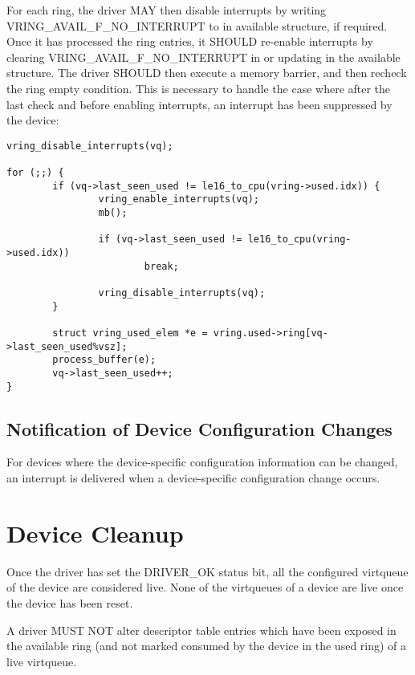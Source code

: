For each ring, the driver MAY then disable interrupts by writing
VRING_AVAIL_F_NO_INTERRUPT to  in available structure, if required.
Once it has processed the ring entries, it SHOULD re-enable
interrupts by clearing VRING_AVAIL_F_NO_INTERRUPT in  or updating
 in the available structure.  The driver SHOULD then
execute a memory barrier, and then recheck the ring empty
condition. This is necessary to handle the case where after the
last check and before enabling interrupts, an interrupt has been
suppressed by the device:

\begin{lstlisting}
vring_disable_interrupts(vq);

for (;;) {
        if (vq->last_seen_used != le16_to_cpu(vring->used.idx)) {
                vring_enable_interrupts(vq);
                mb();

                if (vq->last_seen_used != le16_to_cpu(vring->used.idx))
                        break;

                vring_disable_interrupts(vq);
        }

        struct vring_used_elem *e = vring.used->ring[vq->last_seen_used%vsz];
        process_buffer(e);
        vq->last_seen_used++;
}
\end{lstlisting}

\subsection{Notification of Device Configuration Changes}\label{sec:General Initialization And Device Operation / Device Operation / Notification of Device Configuration Changes}

For devices where the device-specific configuration information can be changed, an
interrupt is delivered when a device-specific configuration change occurs.

\section{Device Cleanup}\label{sec:General Initialization And Device Operation / Device Cleanup}

Once the driver has set the DRIVER_OK status bit, all the configured
virtqueue of the device are considered live.  None of the virtqueues
of a device are live once the device has been reset.

A driver MUST NOT alter descriptor table entries which have been
exposed in the available ring (and not marked consumed by the device
in the used ring) of a live virtqueue.

